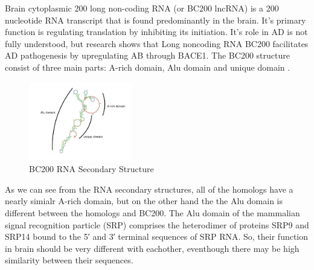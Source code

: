 \documentclass[conference]{IEEEtran}
\begin{document}
Brain cytoplasmic 200 long non-coding RNA (or BC200 lncRNA) is a 200 nucleotide RNA transcript that is found predominantly in the brain. It's primary function is regulating translation by inhibiting its initiation.
It's role in AD is not fully understood, but research shows that Long noncoding RNA BC200 facilitates AD pathogenesis by upregulating AB through BACE1.\cite{li2018identification}
The BC200 structure consist of three main parts: A-rich domain, Alu domain and unique domain \cite{jung2014rna}.
\begin{figure}
  \centering
  \includegraphics[width=0.4\textwidth]{figs/rna-6.png}
  \caption{BC200 RNA Secondary Structure}
\end{figure}
As we can see from the RNA secondary structures, all of the homologs have a nearly simialr A-rich domain, but on the other hand the the Alu domain is different between the homologs and BC200. The Alu domain of the mammalian signal recognition particle (SRP) comprises the heterodimer of proteins SRP9 and SRP14 bound to the 5′ and 3′ terminal sequences of SRP RNA\cite{weichenrieder2000structure}. So, their function in brain should be very different with eachother, eventhough there may be high similarity between their sequences.
\end{document}
